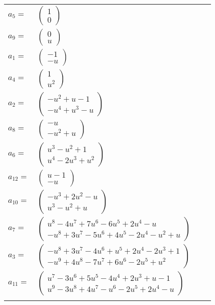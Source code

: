 \documentclass[1p]{elsarticle_modified}
\theoremstyle{definition}
\begin{document}
\begin{tabular}{m{7pt} m{180pt} m{7pt} m{180pt} }
\flushright $a_{5}=$&$\begin{pmatrix}1\\0\end{pmatrix}$ \\
\flushright $a_{9}=$&$\begin{pmatrix}0\\u\end{pmatrix}$ \\
\flushright $a_{1}=$&$\begin{pmatrix}-1\\- u\end{pmatrix}$ \\
\flushright $a_{4}=$&$\begin{pmatrix}1\\u^2\end{pmatrix}$ \\
\flushright $a_{2}=$&$\begin{pmatrix}- u^2+u-1\\- u^4+u^3- u\end{pmatrix}$ \\
\flushright $a_{8}=$&$\begin{pmatrix}- u\\- u^2+u\end{pmatrix}$ \\
\flushright $a_{6}=$&$\begin{pmatrix}u^3- u^2+1\\u^4-2 u^3+u^2\end{pmatrix}$ \\
\flushright $a_{12}=$&$\begin{pmatrix}u-1\\- u\end{pmatrix}$ \\
\flushright $a_{10}=$&$\begin{pmatrix}- u^3+2 u^2- u\\u^3- u^2+u\end{pmatrix}$ \\
\flushright $a_{7}=$&$\begin{pmatrix}u^8-4 u^7+7 u^6-6 u^5+2 u^4- u\\- u^8+3 u^7-5 u^6+4 u^5-2 u^4- u^2+u\end{pmatrix}$ \\
\flushright $a_{3}=$&$\begin{pmatrix}- u^8+3 u^7-4 u^6+u^5+2 u^4-2 u^3+1\\- u^9+4 u^8-7 u^7+6 u^6-2 u^5+u^2\end{pmatrix}$ \\
\flushright $a_{11}=$&$\begin{pmatrix}u^7-3 u^6+5 u^5-4 u^4+2 u^3+u-1\\u^9-3 u^8+4 u^7- u^6-2 u^5+2 u^4- u\end{pmatrix}$\\&\end{tabular}
\end{document}

